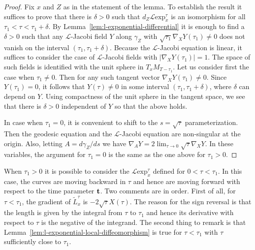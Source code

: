 \begin{proof}
\sketch
{}
Fix $x$ and $Z$ as in the statement of the lemma. To establish the result it
suffices to prove that there is $\delta>0$ such that $d_Z{\mathcal L}\mathrm{exp}_x^{\tau}$ is an isomorphism for all $\tau_1<\tau<\tau_1+\delta$. By
Lemma~\ref{lem:l-exponential-differential} it is enough to find a $\delta>0$ such that any ${\mathcal
L}$-Jacobi field $Y$ along
 $\gamma_Z$ with $\sqrt{\tau_1}\nabla_XY(\tau_1)\not= 0$ does
 not vanish on the interval $(\tau_1,\tau_1+\delta)$.
 Because the ${\mathcal L}$-Jacobi equation is linear, it suffices to consider the
 case of ${\mathcal L}$-Jacobi fields with
 $|\nabla_XY(\tau_1)|=1$. The space of such fields is identified with the
 unit sphere in $T_xM_{T-\tau_1}$.
 Let us consider first the case when $\tau_1\not= 0$. Then for any
 such tangent vector $\nabla_XY(\tau_1)\not=0$. Since $Y(\tau_1)=0$,
 it follows that $Y(\tau)\not=0$ in some interval
 $(\tau_1,\tau_1+\delta)$, where $\delta$ can depend on $Y$.  Using
 compactness of the unit sphere in the tangent space, we see that there is $\delta>0$
 independent of $Y$ so that the above holds.

 In case when $\tau_1=0$, it is convenient to shift to the
 $s=\sqrt{\tau}$ parameterization. Then the geodesic equation and
 the ${\mathcal L}$-Jacobi equation are non-singular at the origin. Also, letting
 $A=d\gamma_Z/ds$ we have $\nabla_AY=2\lim_{\tau\rightarrow
 0}\sqrt{\tau}\nabla_XY$. In these variables, the argument for $\tau_1=0$
 is the same as the one above for $\tau_1>0$.
\end{proof}

\begin{remark}\label{rem:l-exponential-backward-tau}
\label{backwards}
When $\tau_1>0$ it is possible to consider the ${\mathcal L}\mathrm{exp}^{\tau}_x$ defined for $0<\tau<\tau_1$. In this case, the curves
are moving backward in $\tau$ and hence are moving forward with
respect to the time parameter ${\bf t}$. Two comments are in order.
First of all, for $\tau<\tau_1$, the gradient of ${\widetilde
L}^{\tau}_x$ is $-2\sqrt{\tau}X(\tau)$. The reason for the sign
reversal is that the length is given by the integral from $\tau$ to
$\tau_1$ and hence its derivative with respect to $\tau$ is the
negative of the integrand. The second thing to remark is that
Lemma~\ref{lem:l-exponential-local-diffeomorphism} is true for $\tau<\tau_1$ with $\tau$
sufficiently close to $\tau_1$.
\end{remark}

